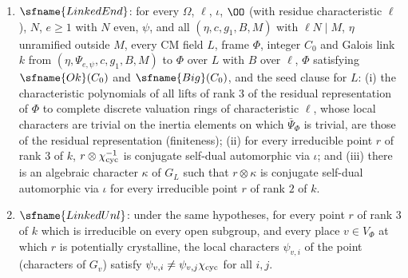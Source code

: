 \begin{definition}\label{pf:modularity:linkedstmts}
\begin{enumerate}[label=(\alph*)]
\item $\sfname{LinkedEnd}$: for every $\Omega$, $\ell$, $\iota$, $\OO$ (with residue characteristic $\ell$), $N$, $e\ge1$
with $N$ even, $\psi$, and all $(\eta,c,g_1,B,M)$ with $\ell N\mid M$, $\eta$ unramified outside $M$, every CM field $L$,
frame $\Phi$, integer $C_0$ and Galois link $k$ from $(\eta,\Psi_{e,\psi},c,g_1,B,M)$ to $\Phi$ over $L$ with $B$ over
$\ell$, $\Phi$ satisfying $\sfname{Ok}(C_0)$ and $\sfname{Big}(C_0)$, and the seed clause for $L$: (i) the characteristic
polynomials of all lifts of rank $3$ of the residual representation of $\Phi$ to complete discrete valuation rings of
characteristic $\ell$, whose local characters are trivial on the inertia elements on which $\bar\Psi_\Phi$ is trivial,
are those of the residual representation (finiteness); (ii) for every irreducible point $r$ of
rank $3$ of $k$, $r\otimes\chi_{\mathrm{cyc}}^{-1}$ is conjugate self-dual automorphic via $\iota$; and (iii) there is an
algebraic character $\kappa$ of $G_L$ such that $r\otimes\kappa$ is conjugate self-dual automorphic via $\iota$ for
every irreducible point $r$ of rank $2$ of $k$.
\item $\sfname{LinkedUnl}$: under the same hypotheses, for every point $r$ of rank $3$ of $k$ which is irreducible on
every open subgroup, and every place $v\in V_\Phi$ at which $r$ is potentially crystalline, the local characters
$\psi_{v,i}$ of the point (characters of $G_v$) satisfy $\psi_{v,i}\ne\psi_{v,j}\chi_{\mathrm{cyc}}$ for all $i,j$.
\end{enumerate}
\end{definition}

